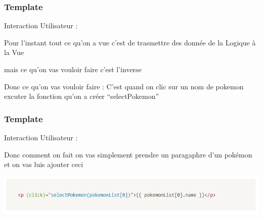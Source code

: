 \documentclass[10pt]{beamer}
\begin{document}
	\begin{frame}
		\frametitle{Template}

		Interaction Utilisateur : \newline \newline

		Pour l’instant tout ce qu’on a vue c’est de trasmettre des donnée de la \alert{Logique} à la \alert{Vue} \newline \newline

		mais ce qu’on vas vouloir faire c’est l’inverse \newline \newline


		Donc ce qu’on vas vouloir faire : \newline
		C’est quand on clic sur un nom de pokemon  \newline excuter la fonction qu’on a créer “selectPokemon” \newline \newline


	\end{frame}

    \begin{frame}
        \frametitle{Template}

        Interaction Utilisateur : \newline \newline

        Donc comment on fait on vas simplement prendre un paragaphre d’un pokémon et on vas luis ajouter ceci \newline

        \centering
        \includegraphics[width=14cm]{assets/interClick} \newline

    \end{frame}
\end{document}
